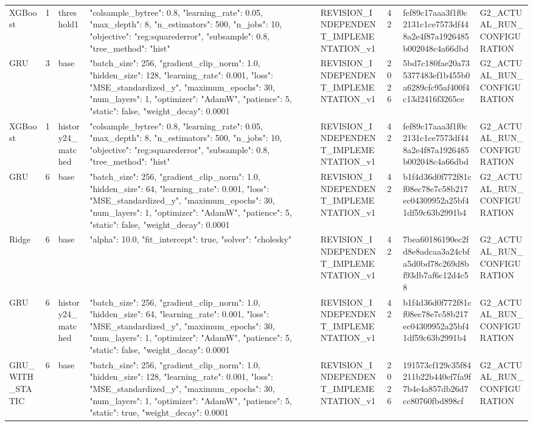 \begin{longtable}{llllllll}
XGBoost & 1 & threshold1 & {"colsample\_bytree": 0.8, "learning\_rate": 0.05, "max\_depth": 8, "n\_estimators": 500, "n\_jobs": 10, "objective": "reg:squarederror", "subsample": 0.8, "tree\_method": "hist"} & REVISION\_INDEPENDENT\_IMPLEMENTATION\_v1 & 42 & fef89c17aaa3f1f0c2131c1ce7573df448a2e4f87a1926485b002048c4a66dbd & G2\_ACTUAL\_RUN\_CONFIGURATION \\
GRU & 3 & base & {"batch\_size": 256, "gradient\_clip\_norm": 1.0, "hidden\_size": 128, "learning\_rate": 0.001, "loss": "MSE\_standardized\_y", "maximum\_epochs": 30, "num\_layers": 1, "optimizer": "AdamW", "patience": 5, "static": false, "weight\_decay": 0.0001} & REVISION\_INDEPENDENT\_IMPLEMENTATION\_v1 & 2026 & 5bd7c180fae20a735377483ef1b455b0a6289cfc95af400f4c13d2416f3265ce & G2\_ACTUAL\_RUN\_CONFIGURATION \\
XGBoost & 1 & history24\_matched & {"colsample\_bytree": 0.8, "learning\_rate": 0.05, "max\_depth": 8, "n\_estimators": 500, "n\_jobs": 10, "objective": "reg:squarederror", "subsample": 0.8, "tree\_method": "hist"} & REVISION\_INDEPENDENT\_IMPLEMENTATION\_v1 & 42 & fef89c17aaa3f1f0c2131c1ce7573df448a2e4f87a1926485b002048c4a66dbd & G2\_ACTUAL\_RUN\_CONFIGURATION \\
GRU & 6 & base & {"batch\_size": 256, "gradient\_clip\_norm": 1.0, "hidden\_size": 64, "learning\_rate": 0.001, "loss": "MSE\_standardized\_y", "maximum\_epochs": 30, "num\_layers": 1, "optimizer": "AdamW", "patience": 5, "static": false, "weight\_decay": 0.0001} & REVISION\_INDEPENDENT\_IMPLEMENTATION\_v1 & 42 & b1f4d36d0f772f81cf08ec78e7c58b217ec04309952a25bf41df59c63b2991b4 & G2\_ACTUAL\_RUN\_CONFIGURATION \\
Ridge & 6 & base & {"alpha": 10.0, "fit\_intercept": true, "solver": "cholesky"} & REVISION\_INDEPENDENT\_IMPLEMENTATION\_v1 & 42 & 7bea60186190ec2fd8e8adcaa3a24cbfa5d0bd78c269d8bf93db7af6c12d4c58 & G2\_ACTUAL\_RUN\_CONFIGURATION \\
GRU & 6 & history24\_matched & {"batch\_size": 256, "gradient\_clip\_norm": 1.0, "hidden\_size": 64, "learning\_rate": 0.001, "loss": "MSE\_standardized\_y", "maximum\_epochs": 30, "num\_layers": 1, "optimizer": "AdamW", "patience": 5, "static": false, "weight\_decay": 0.0001} & REVISION\_INDEPENDENT\_IMPLEMENTATION\_v1 & 42 & b1f4d36d0f772f81cf08ec78e7c58b217ec04309952a25bf41df59c63b2991b4 & G2\_ACTUAL\_RUN\_CONFIGURATION \\
GRU\_WITH\_STATIC & 6 & base & {"batch\_size": 256, "gradient\_clip\_norm": 1.0, "hidden\_size": 128, "learning\_rate": 0.001, "loss": "MSE\_standardized\_y", "maximum\_epochs": 30, "num\_layers": 1, "optimizer": "AdamW", "patience": 5, "static": true, "weight\_decay": 0.0001} & REVISION\_INDEPENDENT\_IMPLEMENTATION\_v1 & 2026 & 191573cf129c35f84211b22b440ef7fa9f7b4e4a857db26d7cc80760fbd898cf & G2\_ACTUAL\_RUN\_CONFIGURATION \\

\end{longtable}
